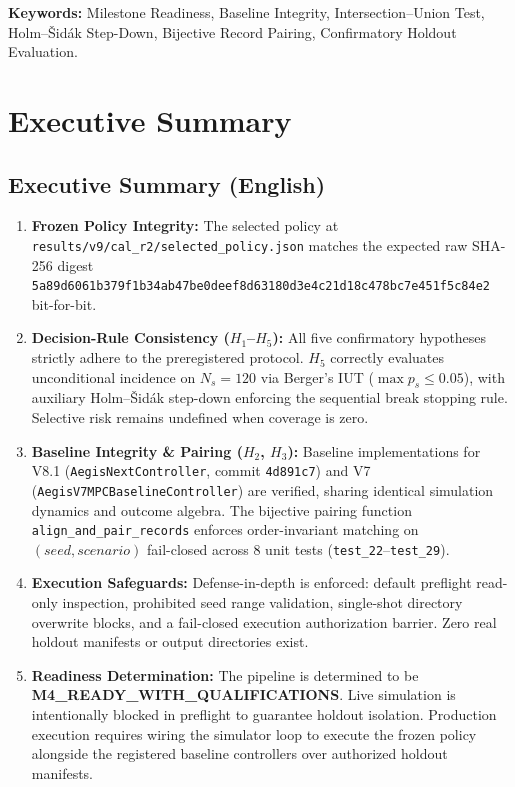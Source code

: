 \documentclass[10pt,a4paper]{article}
\begin{document}
\vspace{6pt}
\noindent \textbf{Keywords:} Milestone Readiness, Baseline Integrity, Intersection--Union Test, Holm--Šidák Step-Down, Bijective Record Pairing, Confirmatory Holdout Evaluation.

\section{Executive Summary}

\subsection{Executive Summary (English)}
\begin{enumerate}
    \item \textbf{Frozen Policy Integrity:} The selected policy at \texttt{results/v9/cal\_r2/selected\_policy.json} matches the expected raw SHA-256 digest \texttt{5a89d6061b379f1b34ab47be0deef8d63180d3e4c21d18c478bc7e451f5c84e2} bit-for-bit.
    \item \textbf{Decision-Rule Consistency ($H_1$--$H_5$):} All five confirmatory hypotheses strictly adhere to the preregistered protocol. $H_5$ correctly evaluates unconditional incidence on $N_s = 120$ via Berger's IUT ($\max p_s \le 0.05$), with auxiliary Holm--Šidák step-down enforcing the sequential break stopping rule. Selective risk remains undefined when coverage is zero.
    \item \textbf{Baseline Integrity \& Pairing ($H_2$, $H_3$):} Baseline implementations for V8.1 (\texttt{AegisNextController}, commit \texttt{4d891c7}) and V7 (\texttt{AegisV7MPCBaselineController}) are verified, sharing identical simulation dynamics and outcome algebra. The bijective pairing function \texttt{align\_and\_pair\_records} enforces order-invariant matching on $(seed, scenario)$ fail-closed across 8 unit tests (\texttt{test\_22}--\texttt{test\_29}).
    \item \textbf{Execution Safeguards:} Defense-in-depth is enforced: default preflight read-only inspection, prohibited seed range validation, single-shot directory overwrite blocks, and a fail-closed execution authorization barrier. Zero real holdout manifests or output directories exist.
    \item \textbf{Readiness Determination:} The pipeline is determined to be \textbf{M4\_READY\_WITH\_QUALIFICATIONS}. Live simulation is intentionally blocked in preflight to guarantee holdout isolation. Production execution requires wiring the simulator loop to execute the frozen policy alongside the registered baseline controllers over authorized holdout manifests.
\end{enumerate}
\end{document}
